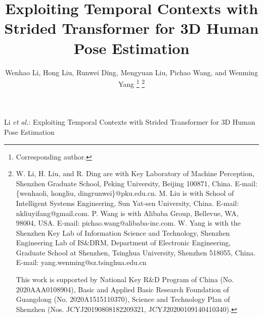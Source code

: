 \documentclass[journal]{IEEEtran}
\begin{document}
\title{Exploiting Temporal Contexts with Strided Transformer for 3D Human Pose Estimation}

\author{
Wenhao Li, Hong Liu, Runwei Ding, Mengyuan Liu, Pichao Wang, and Wenming Yang
\thanks{ Corresponding author.}
\thanks{W. Li, H. Liu, and R. Ding are with Key Laboratory of Machine Perception, Shenzhen Graduate School, Peking University, Beijing 100871, China. 
E-mail: \{wenhaoli, hongliu, dingrunwei\}@pku.edu.cn. 
M. Liu is with School of Intelligent Systems Engineering, Sun Yat-sen University, China. E-mail: nkliuyifang@gmail.com. 
P. Wang is with Alibaba Group, Bellevue, WA, 98004, USA. 
E-mail: pichao.wang@alibaba-inc.com. 
W. Yang is with the Shenzhen Key Lab of Information Science and Technology, Shenzhen Engineering Lab of
IS\&DRM, Department of Electronic Engineering, Graduate School at Shenzhen, Tsinghua University, Shenzhen 518055, China. 
E-mail: yang.wenming@sz.tsinghua.edu.cn

This work is supported by National Key R\&D Program of China (No. 2020AAA0108904), Basic and Applied Basic Research Foundation of Guangdong (No. 2020A1515110370), Science and Technology Plan of Shenzhen (Nos. JCYJ20190808182209321, JCYJ20200109140410340).}
}

\markboth{}
{Li \MakeLowercase{\textit{et al.}}: 
Exploiting Temporal Contexts with Strided Transformer for 3D Human Pose Estimation}

\maketitle
\end{document}
